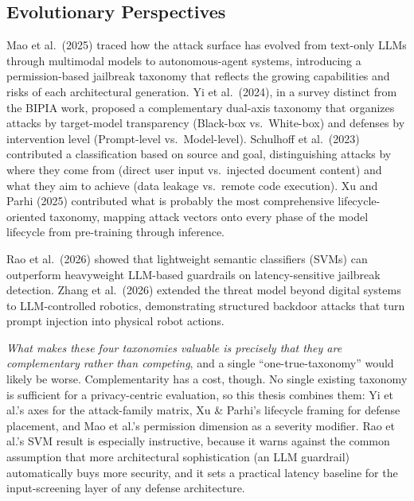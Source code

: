 \documentclass[11pt,a4paper]{report}
\begin{document}
\subsection{Evolutionary Perspectives}

Mao et al.\ (2025) traced how the attack surface has evolved from text-only LLMs through multimodal models to autonomous-agent systems, introducing a permission-based jailbreak taxonomy that reflects the growing capabilities and risks of each architectural generation. Yi et al.\ (2024), in a survey distinct from the BIPIA work, proposed a complementary dual-axis taxonomy that organizes attacks by target-model transparency (Black-box vs.\ White-box) and defenses by intervention level (Prompt-level vs.\ Model-level). Schulhoff et al.\ (2023) contributed a classification based on source and goal, distinguishing attacks by where they come from (direct user input vs.\ injected document content) and what they aim to achieve (data leakage vs.\ remote code execution). Xu and Parhi (2025) contributed what is probably the most comprehensive lifecycle-oriented taxonomy, mapping attack vectors onto every phase of the model lifecycle from pre-training through inference.

Rao et al.\ (2026) showed that lightweight semantic classifiers (SVMs) can outperform heavyweight LLM-based guardrails on latency-sensitive jailbreak detection. Zhang et al.\ (2026) extended the threat model beyond digital systems to LLM-controlled robotics, demonstrating structured backdoor attacks that turn prompt injection into physical robot actions.

\begin{critbox}
\textit{What makes these four taxonomies valuable is precisely that they are complementary rather than competing}, and a single ``one-true-taxonomy'' would likely be worse. Complementarity has a cost, though. No single existing taxonomy is sufficient for a privacy-centric evaluation, so this thesis combines them: Yi et al.'s axes for the attack-family matrix, Xu \& Parhi's lifecycle framing for defense placement, and Mao et al.'s permission dimension as a severity modifier. Rao et al.'s SVM result is especially instructive, because it warns against the common assumption that more architectural sophistication (an LLM guardrail) automatically buys more security, and it sets a practical latency baseline for the input-screening layer of any defense architecture.
\end{critbox}
\end{document}
